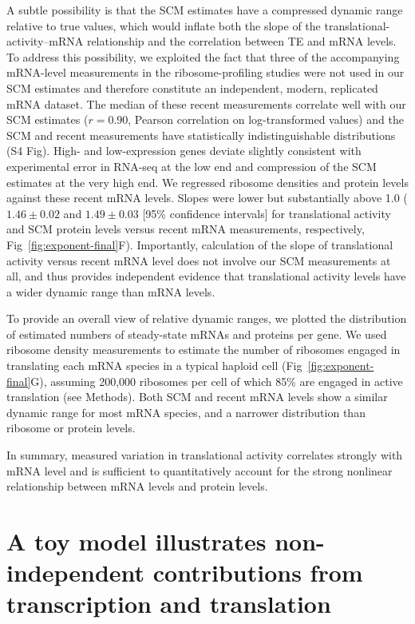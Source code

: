 \documentclass[10pt]{article}
\begin{document}
A subtle possibility is that the SCM estimates have a compressed dynamic range relative to true values, which would inflate both the slope of the translational-activity--mRNA relationship and the correlation between TE and mRNA levels. To address this possibility, we exploited the fact that three of the accompanying mRNA-level measurements in the ribosome-profiling studies \cite{gerashchenko12,McManus2014,Subtelny2014} were not used in our SCM estimates and therefore constitute an independent, modern, replicated mRNA dataset. The median of these recent measurements correlate well with our SCM estimates ($r=0.90$, Pearson correlation on log-transformed values) and the SCM and recent measurements have statistically indistinguishable distributions (S4 Fig). High- and low-expression genes deviate slightly consistent with experimental error in RNA-seq at the low end and compression of the SCM estimates at the very high end. We regressed ribosome densities and protein levels against these recent mRNA levels.  Slopes were lower but substantially above 1.0 ($1.46 \pm 0.02$ and $1.49 \pm 0.03$ [95\% confidence intervals] for translational activity and SCM protein levels versus recent mRNA measurements, respectively, Fig~\ref{fig:exponent-final}F). Importantly, calculation of the slope of translational activity versus recent mRNA level does not involve our SCM measurements at all, and thus provides independent evidence that translational activity levels have a wider dynamic range than mRNA levels.

To provide an overall view of relative dynamic ranges, we plotted the distribution of estimated numbers of steady-state mRNAs and proteins per gene. We used ribosome density measurements to estimate the number of ribosomes engaged in translating each mRNA species in a typical haploid cell (Fig~\ref{fig:exponent-final}G), assuming 200,000 ribosomes per cell \cite{Warner1999} of which 85\% are engaged in active translation (see Methods). Both SCM and recent mRNA levels show a similar dynamic range for most mRNA species, and a narrower distribution than ribosome or protein levels. 

In summary, measured variation in translational activity correlates strongly with mRNA level and is sufficient to quantitatively account for the strong nonlinear relationship between mRNA levels and protein levels.

\section*{A toy model illustrates non-independent contributions from transcription and translation}
\end{document}
